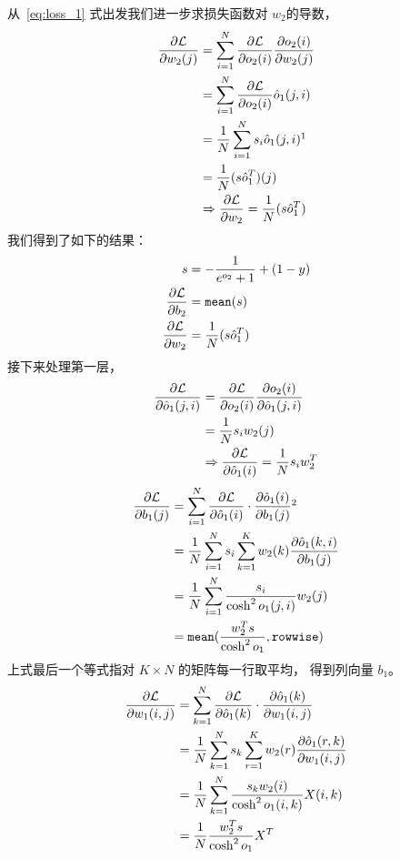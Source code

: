 \documentclass{ctexart}
\begin{document}
从~\eqref{eq:loss_1} 式出发我们进一步求损失函数对 $w_2$的导数，
\begin{align*}
\frac{\partial \mathcal{L}}{\partial w_2(j)}  & =  \sum_{i=1}^N \frac{\partial \mathcal{L}}{\partial o_2(i)} \frac{\partial o_2(i)}{\partial w_2(j)} \\
& =  \sum_{i=1}^N \frac{\partial \mathcal{L}}{\partial o_2(i)} \hat{o}_1(j,i) \\
& = {1\over N} \sum_{i=1}^N s_i \hat{o}_1(j,i)\footnotemark \\
& ={1\over N} (s \hat{o}_1^T)(j) \\
& \Rightarrow \frac{\partial \mathcal{L}}{\partial w_2} ={1\over N} (s \hat{o}_1^T)
\end{align*}
我们得到了如下的结果：
\begin{align}
  	s & = -\frac{1}{ e^{ o_2} + 1 } + (1-y)  \\
   \label{eq:one_b_2} \frac{\partial \mathcal{L}}{\partial b_2} & = \mathtt{mean}(s)\\
   \label{eq:one_w_2} \frac{\partial \mathcal{L}}{\partial w_2}  & = {1\over N} (s \hat{o}_1^T)
\end{align}
接下来处理第一层，
\begin{align*}
\frac{\partial \mathcal{L}}{\partial \hat{o}_1(j,i)} & = \frac{\partial \mathcal{L}}{\partial o_2(i)}
\frac{\partial o_2(i)}{\partial \hat{o}_1(j,i)} \\
& = {1\over N} s_i w_2(j) \\
& \Rightarrow  \frac{\partial \mathcal{L}}{\partial \hat{o}_1(i)} = {1\over N} s_i w_2^T
\end{align*}
\begin{align*}
\frac{\partial \mathcal{L}}{\partial b_1(j)}
& = \sum_{i=1}^N \frac{\partial \mathcal{L}}{\partial \hat{o}_1(i)} \cdot \frac{\partial \hat{o}_1(i)}{\partial b_1(j)} \footnotemark\\
& ={1\over N} \sum_{i=1}^N s_i \sum_{k=1}^K w_2(k) \frac{\partial \hat{o}_1(k,i)}{\partial b_1(j)} \\
& ={1\over N} \sum_{i=1}^N \frac{ s_i}{\cosh^2 o_1(j,i)} w_2(j) \\
& = \mathtt{mean}({w_2^T s \over {  \cosh^2 o_1}}, \mathtt{rowwise})
\end{align*}
上式最后一个等式指对 $ K \times N$ 的矩阵每一行取平均， 得到列向量 $b_1$。
\begin{align*}
    \frac{\partial \mathcal{L}}{\partial w_1(i,j)}
    & = \sum_{k=1}^N \frac{\partial \mathcal{L}}{\partial \hat{o}_1(k)} \cdot \frac{\partial \hat{o}_1(k)}{\partial w_1(i,j)} \\
    & ={1 \over N} \sum_{k=1}^N  s_k \sum_{r=1}^K w_2(r)
    \frac{\partial \hat{o}_1(r,k)}{\partial w_1(i,j)} \\    
    & = { 1 \over N}\sum_{k=1}^N  \frac{s_k w_2(i)}{\cosh^2 o_1(i,k)}
    X(i,k) \\        
    & = {1 \over N} {w_2^T s \over {  \cosh^2 o_1} } X^T
\end{align*}
\end{document}
